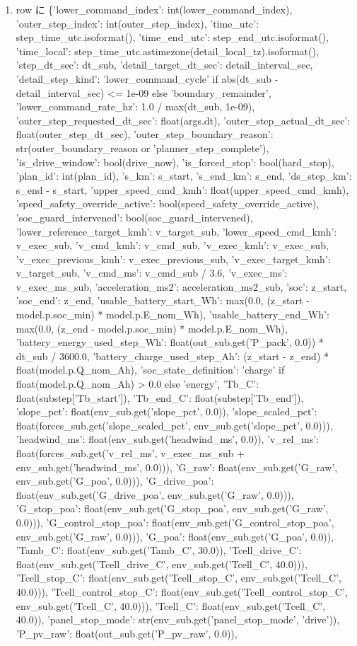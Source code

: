 \documentclass[a4paper,11pt]{article}
\begin{document}
\begin{enumerate}[leftmargin=1.8em]
\item row に \{'lower\_command\_index': int(lower\_command\_index), 'outer\_step\_index': int(outer\_step\_index), 'time\_utc': step\_time\_utc.isoformat(), 'time\_end\_utc': step\_end\_utc.isoformat(), 'time\_local': step\_time\_utc.astimezone(detail\_local\_tz).isoformat(), 'step\_dt\_sec': dt\_sub, 'detail\_target\_dt\_sec': detail\_interval\_sec, 'detail\_step\_kind': 'lower\_command\_cycle' if abs(dt\_sub - detail\_interval\_sec) <= 1e-09 else 'boundary\_remainder', 'lower\_command\_rate\_hz': 1.0 / max(dt\_sub, 1e-09), 'outer\_step\_requested\_dt\_sec': float(args.dt), 'outer\_step\_actual\_dt\_sec': float(outer\_step\_dt\_sec), 'outer\_step\_boundary\_reason': str(outer\_boundary\_reason or 'planner\_step\_complete'), 'is\_drive\_window': bool(drive\_now), 'is\_forced\_stop': bool(hard\_stop), 'plan\_id': int(plan\_id), 's\_km': s\_start, 's\_end\_km': s\_end, 'ds\_step\_km': s\_end - s\_start, 'upper\_speed\_cmd\_kmh': float(upper\_speed\_cmd\_kmh), 'speed\_safety\_override\_active': bool(speed\_safety\_override\_active), 'soc\_guard\_intervened': bool(soc\_guard\_intervened), 'lower\_reference\_target\_kmh': v\_target\_sub, 'lower\_speed\_cmd\_kmh': v\_exec\_sub, 'v\_cmd\_kmh': v\_cmd\_sub, 'v\_exec\_kmh': v\_exec\_sub, 'v\_exec\_previous\_kmh': v\_exec\_previous\_sub, 'v\_exec\_target\_kmh': v\_target\_sub, 'v\_cmd\_ms': v\_cmd\_sub / 3.6, 'v\_exec\_ms': v\_exec\_ms\_sub, 'acceleration\_ms2': acceleration\_ms2\_sub, 'soc': z\_start, 'soc\_end': z\_end, 'usable\_battery\_start\_Wh': max(0.0, (z\_start - model.p.soc\_min) * model.p.E\_nom\_Wh), 'usable\_battery\_end\_Wh': max(0.0, (z\_end - model.p.soc\_min) * model.p.E\_nom\_Wh), 'battery\_energy\_used\_step\_Wh': float(out\_sub.get('P\_pack', 0.0)) * dt\_sub / 3600.0, 'battery\_charge\_used\_step\_Ah': (z\_start - z\_end) * float(model.p.Q\_nom\_Ah), 'soc\_state\_definition': 'charge' if float(model.p.Q\_nom\_Ah) > 0.0 else 'energy', 'Tb\_C': float(substep['Tb\_start']), 'Tb\_end\_C': float(substep['Tb\_end']), 'slope\_pct': float(env\_sub.get('slope\_pct', 0.0)), 'slope\_scaled\_pct': float(forces\_sub.get('slope\_scaled\_pct', env\_sub.get('slope\_pct', 0.0))), 'headwind\_ms': float(env\_sub.get('headwind\_ms', 0.0)), 'v\_rel\_ms': float(forces\_sub.get('v\_rel\_ms', v\_exec\_ms\_sub + env\_sub.get('headwind\_ms', 0.0))), 'G\_raw': float(env\_sub.get('G\_raw', env\_sub.get('G\_poa', 0.0))), 'G\_drive\_poa': float(env\_sub.get('G\_drive\_poa', env\_sub.get('G\_raw', 0.0))), 'G\_stop\_poa': float(env\_sub.get('G\_stop\_poa', env\_sub.get('G\_raw', 0.0))), 'G\_control\_stop\_poa': float(env\_sub.get('G\_control\_stop\_poa', env\_sub.get('G\_raw', 0.0))), 'G\_poa': float(env\_sub.get('G\_poa', 0.0)), 'Tamb\_C': float(env\_sub.get('Tamb\_C', 30.0)), 'Tcell\_drive\_C': float(env\_sub.get('Tcell\_drive\_C', env\_sub.get('Tcell\_C', 40.0))), 'Tcell\_stop\_C': float(env\_sub.get('Tcell\_stop\_C', env\_sub.get('Tcell\_C', 40.0))), 'Tcell\_control\_stop\_C': float(env\_sub.get('Tcell\_control\_stop\_C', env\_sub.get('Tcell\_C', 40.0))), 'Tcell\_C': float(env\_sub.get('Tcell\_C', 40.0)), 'panel\_stop\_mode': str(env\_sub.get('panel\_stop\_mode', 'drive')), 'P\_pv\_raw': float(out\_sub.get('P\_pv\_raw', 0.0)), 
\end{enumerate}
\end{document}
